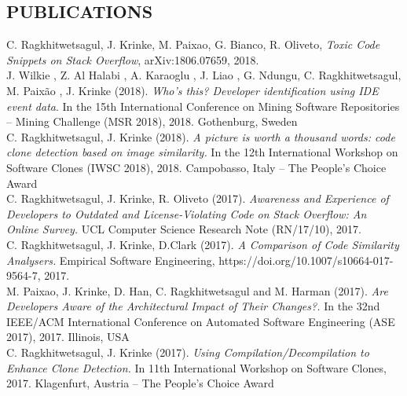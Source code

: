 \documentclass[margin, 10pt]{res} %
\begin{document}
\begin{resume}

\section{PUBLICATIONS}  

C. Ragkhitwetsagul, J. Krinke, M. Paixao, G. Bianco, R. Oliveto, \textit{Toxic Code Snippets on Stack Overflow}, arXiv:1806.07659, 2018.
\vspace{2mm} \\
J. Wilkie , Z. Al Halabi , A. Karaoglu , J. Liao , G. Ndungu, C. Ragkhitwetsagul, M. Paixão , J. Krinke (2018). \textit{Who's this? Developer identification using IDE event data}. In the 15th International Conference on Mining Software Repositories -- Mining Challenge (MSR 2018), 2018. Gothenburg, Sweden 
\vspace{2mm} \\
C. Ragkhitwetsagul, J. Krinke (2018). \textit{A picture is worth a thousand words: code clone detection based on image similarity.} In the 12th International Workshop on Software Clones (IWSC 2018), 2018. Campobasso, Italy -- The People's Choice Award\vspace{2mm} \\
C. Ragkhitwetsagul, J. Krinke, R. Oliveto (2017). \textit{Awareness and Experience of Developers to Outdated and License-Violating Code on Stack Overflow: An Online Survey.} UCL Computer Science Research Note (RN/17/10), 2017. \vspace{2mm} \\
C. Ragkhitwetsagul, J. Krinke, D.Clark (2017). \textit{A Comparison of Code Similarity Analysers.} Empirical Software Engineering, https://doi.org/10.1007/s10664-017-9564-7, 2017. \vspace{2mm} \\
M. Paixao, J. Krinke, D. Han, C. Ragkhitwetsagul and M. Harman (2017). \textit{Are Developers Aware of the Architectural Impact of Their Changes?.} In the 32nd IEEE/ACM International Conference on Automated Software Engineering (ASE 2017), 2017. Illinois, USA \vspace{2mm} \\
C. Ragkhitwetsagul, J. Krinke (2017). \textit{Using Compilation/Decompilation to Enhance Clone Detection.} In 11th International Workshop on Software Clones, 2017. Klagenfurt, Austria -- The People's Choice Award \vspace{2mm} \\

\end{resume}
\end{document}
